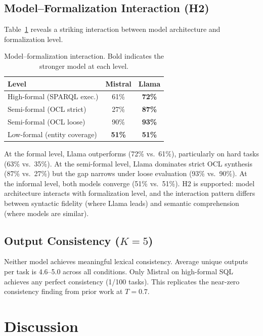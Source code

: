 \documentclass[runningheads]{llncs}
\begin{document}
\subsection{Model--Formalization Interaction (H2)}

Table~\ref{tab:interaction} reveals a striking interaction between model architecture and formalization level.

\begin{table}[h]
\centering
\caption{Model--formalization interaction. Bold indicates the stronger model at each level.}
\label{tab:interaction}
\begin{tabular}{lcc}
\toprule
Level & Mistral & Llama \\
\midrule
High-formal (SPARQL exec.) & 61\% & \textbf{72\%} \\
Semi-formal (OCL strict) & 27\% & \textbf{87\%} \\
Semi-formal (OCL loose) & 90\% & \textbf{93\%} \\
Low-formal (entity coverage) & \textbf{51\%} & \textbf{51\%} \\
\bottomrule
\end{tabular}
\end{table}

At the formal level, Llama outperforms (72\% vs.\ 61\%), particularly on hard tasks (63\% vs.\ 35\%). At the semi-formal level, Llama dominates strict OCL synthesis (87\% vs.\ 27\%) but the gap narrows under loose evaluation (93\% vs.\ 90\%). At the informal level, both models converge (51\% vs.\ 51\%). H2 is supported: model architecture interacts with formalization level, and the interaction pattern differs between syntactic fidelity (where Llama leads) and semantic comprehension (where models are similar).

\subsection{Output Consistency ($K\!=\!5$)}

Neither model achieves meaningful lexical consistency. Average unique outputs per task is 4.6--5.0 across all conditions. Only Mistral on high-formal SQL achieves any perfect consistency (1/100 tasks). This replicates the near-zero consistency finding from prior work at $T\!=\!0.7$.

\section{Discussion}
\label{sec:discussion}
\end{document}
